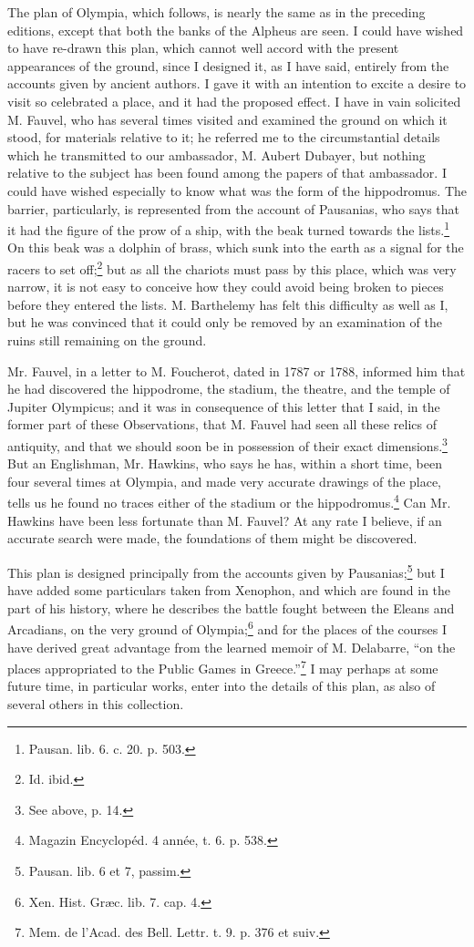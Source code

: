 \documentclass[a4paper, 11pt, oneside, polutonikogreek, english]{article}
\begin{document}
The plan of Olympia, which follows, is nearly the same as in the preceding editions, except that both the banks of the Alpheus are seen. I could have wished to have re-drawn this plan, which cannot well accord with the present appearances of the ground, since I designed it, as I have said, entirely from the accounts given by ancient authors. I gave it with an intention to excite a desire to visit so celebrated a place, and it had the proposed effect. I have in vain solicited M. Fauvel, who has several times visited and examined the ground on which it stood, for materials relative to it; he referred me to the circumstantial details which he transmitted to our ambassador, M. Aubert Dubayer, but nothing relative to the subject has been found among the papers of that ambassador. I could have wished especially to know what was the form of the hippodromus. The barrier, particularly, is represented from the account of Pausanias, who says that it had the figure of the prow of a ship, with the beak turned towards the lists.\footnote{Pausan. lib. 6. c. 20. p. 503.} On this beak was a dolphin of brass, which sunk into the earth as a signal for the racers to set off;\footnote{Id. ibid.} but as all the chariots must pass by this place, which was very narrow, it is not easy to conceive how they could avoid being broken to pieces before they entered the lists. M. Barthelemy has felt this difficulty as well as I, but he was convinced that it could only be removed by an examination of the ruins still remaining on the ground.

Mr. Fauvel, in a letter to M. Foucherot, dated in 1787 or 1788, informed him that he had discovered the hippodrome, the stadium, the theatre, and the temple of Jupiter Olympicus; and it was in consequence of this letter that I said, in the former part of these Observations, that M. Fauvel had seen all these relics of antiquity, and that we should soon be in possession of their exact dimensions.\footnote{See above, p. 14.} But an Englishman, Mr. Hawkins, who says he has, within a short time, been four several times at Olympia, and made very accurate drawings of the place, tells us he found no traces either of the stadium or the hippodromus.\footnote{Magazin Encyclopéd. 4 année, t. 6. p. 538.} Can Mr. Hawkins have been less fortunate than M. Fauvel? At any rate I believe, if an accurate search were made, the foundations of them might be discovered.

This plan is designed principally from the accounts given by Pausanias;\footnote{Pausan. lib. 6 et 7, passim.} but I have added some particulars taken from Xenophon, and which are found in the part of his history, where he describes the battle fought between the Eleans and Arcadians, on the very ground of Olympia;\footnote{Xen. Hist. Græc. lib. 7. cap. 4.} and for the places of the courses I have derived great advantage from the learned memoir of M. Delabarre, ``on the places appropriated to the Public Games in Greece.''\footnote{Mem. de l'Acad. des Bell. Lettr. t. 9. p. 376 et suiv.} I may perhaps at some future time, in particular works, enter into the details of this plan, as also of several others in this collection.
\end{document}
